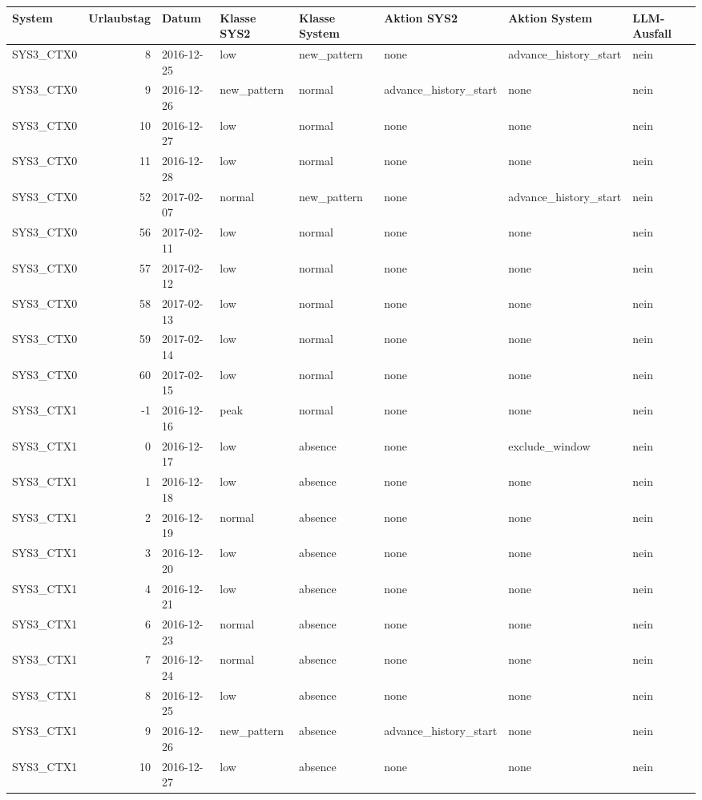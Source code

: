 \begin{tabular}{lrllllll}
\toprule
System & Urlaubstag & Datum & Klasse SYS2 & Klasse System & Aktion SYS2 & Aktion System & LLM-Ausfall \\
\midrule
SYS3\_CTX0 & 8 & 2016-12-25 & low & new\_pattern & none & advance\_history\_start & nein \\
SYS3\_CTX0 & 9 & 2016-12-26 & new\_pattern & normal & advance\_history\_start & none & nein \\
SYS3\_CTX0 & 10 & 2016-12-27 & low & normal & none & none & nein \\
SYS3\_CTX0 & 11 & 2016-12-28 & low & normal & none & none & nein \\
SYS3\_CTX0 & 52 & 2017-02-07 & normal & new\_pattern & none & advance\_history\_start & nein \\
SYS3\_CTX0 & 56 & 2017-02-11 & low & normal & none & none & nein \\
SYS3\_CTX0 & 57 & 2017-02-12 & low & normal & none & none & nein \\
SYS3\_CTX0 & 58 & 2017-02-13 & low & normal & none & none & nein \\
SYS3\_CTX0 & 59 & 2017-02-14 & low & normal & none & none & nein \\
SYS3\_CTX0 & 60 & 2017-02-15 & low & normal & none & none & nein \\
SYS3\_CTX1 & -1 & 2016-12-16 & peak & normal & none & none & nein \\
SYS3\_CTX1 & 0 & 2016-12-17 & low & absence & none & exclude\_window & nein \\
SYS3\_CTX1 & 1 & 2016-12-18 & low & absence & none & none & nein \\
SYS3\_CTX1 & 2 & 2016-12-19 & normal & absence & none & none & nein \\
SYS3\_CTX1 & 3 & 2016-12-20 & low & absence & none & none & nein \\
SYS3\_CTX1 & 4 & 2016-12-21 & low & absence & none & none & nein \\
SYS3\_CTX1 & 6 & 2016-12-23 & normal & absence & none & none & nein \\
SYS3\_CTX1 & 7 & 2016-12-24 & normal & absence & none & none & nein \\
SYS3\_CTX1 & 8 & 2016-12-25 & low & absence & none & none & nein \\
SYS3\_CTX1 & 9 & 2016-12-26 & new\_pattern & absence & advance\_history\_start & none & nein \\
SYS3\_CTX1 & 10 & 2016-12-27 & low & absence & none & none & nein \\

\end{tabular}
